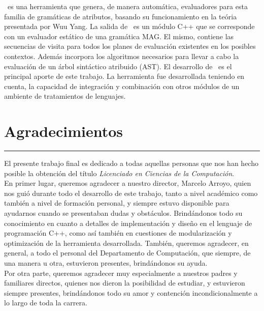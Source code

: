\documentclass[a4paper,11pt]{ThesisStyle}
\begin{document}
\maggen\ es una herramienta que genera, de manera automática, evaluadores para esta familia de gramáticas de atributos, basando su funcionamiento en la teória presentada por Wuu Yang. La salida de \maggen\ es un módulo C++ que se corresponde con un evaluador estático de una gramática MAG. El mismo, contiene las secuencias de visita para todos los planes de evaluación existentes en los posibles contextos. Además incorpora los algoritmos necesarios para llevar a cabo la evaluación de un árbol sintáctico atribuido (AST).
El desarrollo de \maggen\ es el principal aporte de este trabajo. La herramienta fue desarrollada teniendo en cuenta, la capacidad de integración y combinación con otros módulos de un ambiente de tratamientos de lenguajes. 

% 


\cleardoublepage

\chapter*{Agradecimientos}

\noindent\rule[2pt]{\textwidth}{0.5pt}

El presente trabajo final es dedicado a todas aquellas personas que nos han hecho posible la obtención del título \textit{Licenciado en Ciencias de la Computación}.\\

En primer lugar, queremos agradecer a nuestro director, Marcelo Arroyo, quien nos guió durante todo el desarrollo de este trabajo, tanto a nivel académico como también a nivel de formación personal, y siempre estuvo disponible para ayudarnos cuando se presentaban dudas y obstáculos. Brindándonos todo su conocimiento en cuanto a detalles de implementación y diseño en el lenguaje de programación C++, como así también en cuestiones de modularización y optimización de la herramienta desarrollada.
También, queremos agradecer, en general, a todo el personal del Departamento de Computación, que siempre, de una manera u otra, estuvieron presentes, brindándonos su ayuda.\\

Por otra parte, queremos agradecer muy especialmente a nuestros padres y familiares directos, quienes nos dieron la posibilidad de estudiar, y estuvieron siempre presentes, brindándonos todo su amor y contención incondicionalmente a lo largo de toda la carrera.\\ 
\end{document}

